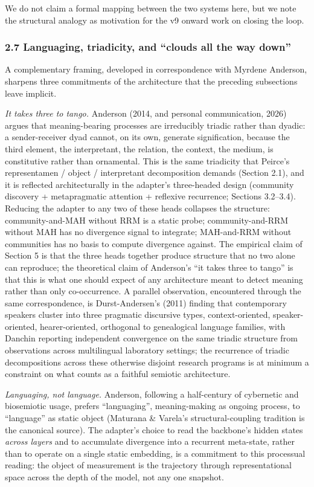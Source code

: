 \documentclass[
  11pt]{article}
\begin{document}
We do not claim a formal mapping between the two systems here, but we
note the structural analogy as motivation for the v9 onward work on
closing the loop.

\subsubsection{2.7 Languaging, triadicity, and ``clouds all the way
down''}\label{languaging-triadicity-and-clouds-all-the-way-down}

A complementary framing, developed in correspondence with Myrdene
Anderson, sharpens three commitments of the architecture that the
preceding subsections leave implicit.

\emph{It takes three to tango.} Anderson (2014, and personal
communication, 2026) argues that meaning-bearing processes are
irreducibly triadic rather than dyadic: a sender-receiver dyad cannot,
on its own, generate signification, because the third element, the
interpretant, the relation, the context, the medium, is constitutive
rather than ornamental. This is the same triadicity that Peirce's
representamen / object / interpretant decomposition demands (Section
2.1), and it is reflected architecturally in the adapter's three-headed
design (community discovery + metapragmatic attention + reflexive
recurrence; Sections 3.2--3.4). Reducing the adapter to any two of these
heads collapses the structure: community-and-MAH without RRM is a static
probe; community-and-RRM without MAH has no divergence signal to
integrate; MAH-and-RRM without communities has no basis to compute
divergence against. The empirical claim of Section 5 is that the three
heads together produce structure that no two alone can reproduce; the
theoretical claim of Anderson's ``it takes three to tango'' is that this
is what one should expect of any architecture meant to detect meaning
rather than only co-occurrence. A parallel observation, encountered
through the same correspondence, is Durst-Andersen's (2011) finding that
contemporary speakers cluster into three pragmatic discursive types,
context-oriented, speaker-oriented, hearer-oriented, orthogonal to
genealogical language families, with Danchin reporting independent
convergence on the same triadic structure from observations across
multilingual laboratory settings; the recurrence of triadic
decompositions across these otherwise disjoint research programs is at
minimum a constraint on what counts as a faithful semiotic architecture.

\emph{Languaging, not language.} Anderson, following a half-century of
cybernetic and biosemiotic usage, prefers ``languaging'', meaning-making
as ongoing process, to ``language'' as static object (Maturana \&
Varela's structural-coupling tradition is the canonical source). The
adapter's choice to read the backbone's hidden states \emph{across
layers} and to accumulate divergence into a recurrent meta-state, rather
than to operate on a single static embedding, is a commitment to this
processual reading: the object of measurement is the trajectory through
representational space across the depth of the model, not any one
snapshot.
\end{document}
